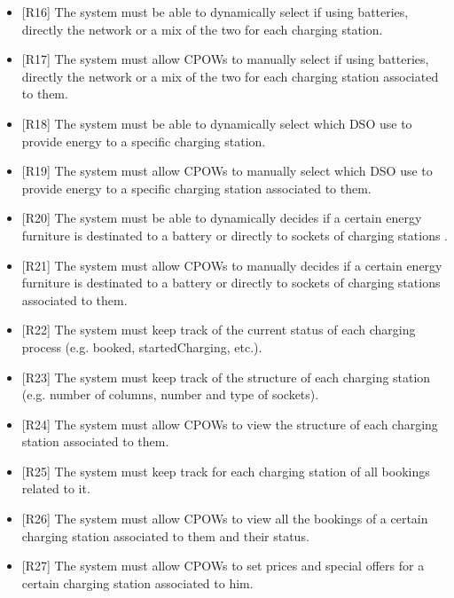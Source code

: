 \documentclass[a4paper]{report}
\begin{document}
\begin{itemize}
    \item{[R16]} \label{R16} The system must be able to dynamically select if using batteries, directly the network or a mix of the two for each charging station. 
    \item{[R17]} \label{R17} The system must allow CPOWs to manually select if using batteries, directly the network or a mix of the two for each charging station associated to them. 
    \item{[R18]} \label{R18} The system must be able to dynamically select which DSO use to provide energy to a specific charging station.
    \item{[R19]} \label{R19} The system must allow CPOWs to manually select which DSO use to provide energy to a specific charging station associated to them.
    \item{[R20]} \label{R20} The system must be able to dynamically decides if a certain energy furniture is destinated to a battery or directly to sockets of charging stations .
    \item{[R21]} \label{R21} The system must allow CPOWs to manually decides if a certain energy furniture is destinated to a battery or directly to sockets of charging stations associated to them.
    \item{[R22]} \label{R22} The system must keep track of the current status of each charging process (e.g. booked, startedCharging, etc.).
    \item{[R23]} \label{R23} The system must keep track of the structure of each charging station (e.g. number of columns, number and type of sockets).
    \item{[R24]} \label{R24} The system must allow CPOWs to view the structure of each charging station associated to them.
    \item{[R25]} \label{R25} The system must keep track for each charging station of all bookings related to it.
    \item{[R26]} \label{R26} The system must allow CPOWs to view all the bookings of a certain charging station associated to them and their status.
    \item{[R27]} \label{R27} The system must allow CPOWs to set prices and special offers for a certain charging station associated to him.
\end{itemize}
\end{document}
